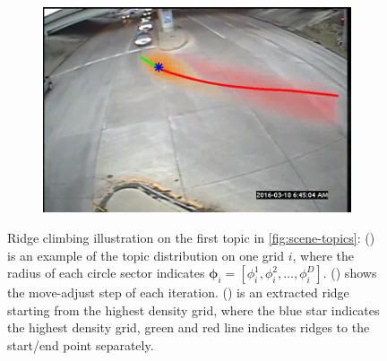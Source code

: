 \begin{figure}
\begin{subfigure}{0.35\linewidth}
        \subcaption{}
        \label{subfig:scene-step}
    \end{subfigure}
    \begin{subfigure}{0.35\linewidth}
        \includegraphics[width=\linewidth]{./img/scene_learning/single_ridge-1.jpg}
        \subcaption{}
        \label{subfig:scene-single-ridge}
    \end{subfigure}%
    \caption{Ridge climbing illustration on the first topic in \ref{fig:scene-topics}: () is an example of the topic distribution on one grid $i$, where the radius of each circle sector indicates $\bm{\phi}_i= [\phi_i^{1}, \phi_i^{2}, \dots, \phi_i^{D}]$. () shows the move-adjust step of each iteration. () is an extracted ridge starting from the highest density grid, where the blue star indicates the highest density grid, green and red line indicates ridges to the start/end point separately.}
    \label{fig:scene-step}
\end{figure}